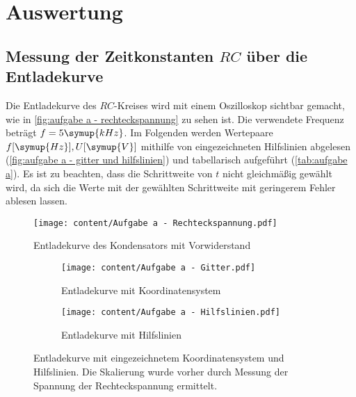 \section{Auswertung}
\label{sec:Auswertung}
\subsection{Messung der Zeitkonstanten $RC$ über die Entladekurve}
Die Entladekurve des $RC$-Kreises wird mit einem Oszilloskop sichtbar gemacht, wie 
in \autoref{fig:aufgabe a - rechteckspannung} zu sehen ist. Die verwendete Frequenz beträgt $f=5\symup{kHz}$.
Im Folgenden werden Wertepaare {$f [\symup{Hz}], U [\symup{V}]$} mithilfe von eingezeichneten Hilfslinien abgelesen
(\autoref{fig:aufgabe a - gitter und hilfslinien}) und tabellarisch aufgeführt (\autoref{tab:aufgabe a}). Es ist zu beachten,
dass die Schrittweite von $t$ nicht gleichmäßig gewählt wird, da sich die Werte mit der gewählten Schrittweite mit
geringerem Fehler ablesen lassen.
\begin{figure}
  \centering
  \texttt{[image: content/Aufgabe a - Rechteckspannung.pdf]}
  \caption{Entladekurve des Kondensators mit Vorwiderstand}
  \label{fig:aufgabe a - rechteckspannung}
\end{figure}

\begin{figure}
  \begin{subfigure}{0.48\textwidth}
    \centering
    \texttt{[image: content/Aufgabe a - Gitter.pdf]}
    \caption{Entladekurve mit Koordinatensystem}
    \label{fig:aufgabe a - gitter}
  \end{subfigure}
  \hfill
  \begin{subfigure}{0.48\textwidth}
    \centering
    \texttt{[image: content/Aufgabe a - Hilfslinien.pdf]}
    \caption{Entladekurve mit Hilfslinien}
    \label{fig:aufgabe a - hilfslinien}
  \end{subfigure}
  \caption{Entladekurve mit eingezeichnetem Koordinatensystem und Hilfslinien. Die %
    Skalierung wurde vorher durch Messung der Spannung der Rechteckspannung ermittelt.}
  \label{fig:aufgabe a - gitter und hilfslinien}
\end{figure}

